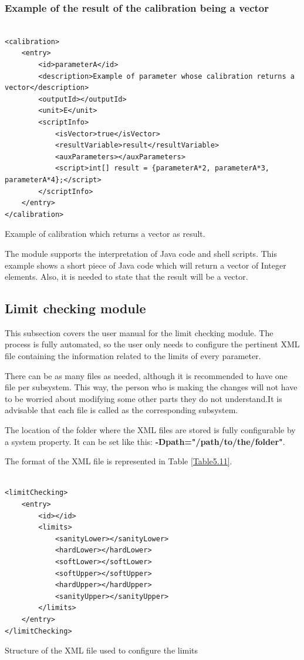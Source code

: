 \subsubsection{Example of the result of the calibration being a vector}

 \begin{table}[H]
\lstset{language=XML}
\begin{lstlisting}

<calibration>
	<entry>
		<id>parameterA</id>
		<description>Example of parameter whose calibration returns a vector</description>
		<outputId></outputId>
		<unit>E</unit>
		<scriptInfo>
			<isVector>true</isVector>
			<resultVariable>result</resultVariable>
			<auxParameters></auxParameters>
			<script>int[] result = {parameterA*2, parameterA*3, parameterA*4};</script>
		</scriptInfo>
	</entry>
</calibration>
\end{lstlisting}
\caption{Example of calibration which returns a vector as result.} 
\label{Table5.10}
\end{table}

The module supports the interpretation of Java code and shell scripts. This example shows a short piece of Java code which will return a vector of Integer elements. Also, it is needed to state that the result will be a vector.




\subsection{Limit checking module}
This subsection covers the user manual for the limit checking module. The process is fully automated, so the user only needs to configure the pertinent XML file containing the information related to the limits of every parameter. 

There can be as many files as needed, although it is recommended to have one file per subsystem. This way, the person who is making the changes will not have to be worried about modifying some other parts they do not understand.It is advisable that each file is called as the corresponding subsystem.

The location of the folder where the XML files are stored is fully configurable by a system property. It can be set like this: \textbf{-Dpath="/path/to/the/folder"}.
\pagebreak

The format of the XML file is represented in Table \ref{Table5.11}.
\begin{table}[H]
\lstset{language=XML}
\begin{lstlisting}

<limitChecking>
	<entry>
		<id></id>
		<limits>
			<sanityLower></sanityLower>
			<hardLower></hardLower>
			<softLower></softLower>
			<softUpper></softUpper>
			<hardUpper></hardUpper>
			<sanityUpper></sanityUpper>
		</limits>
	</entry>
</limitChecking>
\end{lstlisting}
\caption{Structure of the XML file used to configure the limits}
\label{Table5.11}
\end{table}

